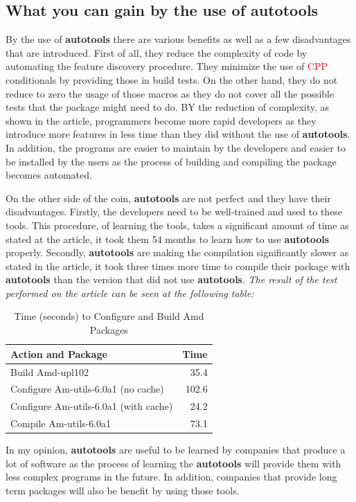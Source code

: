 \documentclass[11pt]{article}
\begin{document}
\subsection{What you can gain by the use of autotools}
By the use of \textbf{autotools} there are various benefits as well as a few disadvantages that are introduced. First of all, they reduce the complexity of code by automating the feature discovery procedure. They minimize the use of \textcolor{red}{CPP} conditionals by providing those in build tests. On the other hand, they do not reduce to zero the usage of those macros as they do not cover all the possible tests that the package might need to do. BY the reduction of complexity, as shown in the article, programmers become more rapid developers as they introduce more features in less time than they did without the use of \textbf{autotools}. In addition, the programs are easier to maintain by the developers and easier to be installed by the users as the process of building and compiling the package becomes automated.

On the other side of the coin, \textbf{autotools} are not perfect and they have their disadvantages. Firstly, the developers need  to be well-trained and used to these tools. This procedure, of learning the tools, takes a significant amount of time as stated at the article, it took them 54 months to learn how to use \textbf{autotools} properly. Secondly, \textbf{autotools} are making the compilation significantly slower as stated in the article, it took three times more time to compile their package with \textbf{autotools} than the version that did not use \textbf{autotools}. \textit{The result of the test performed on the article can be seen at the following table:}

\begin{table}[!htb]
\centering

\begin{tabular}{|l|r|}
\hline
Action and Package & Time\\ \hline
Build Amd-upl102 & 35.4\\ \hline
Configure Am-utils-6.0a1 (no cache) & 102.6\\
Configure Am-utils-6.0a1 (with cache) & 24.2\\
Compile Am-utils-6.0a1 & 73.1\\ \hline
\end{tabular}
\caption{Time (seconds) to Configure and Build Amd Packages \cite{zadok2002}}
\label{table:buildTest}
\end{table}
\FloatBarrier

In my opinion, \textbf{autotools} are useful to be learned by companies that produce a lot of software as the process of learning the \textbf{autotools} will provide them with less complex programs in the future. In addition, companies that provide long term packages will also be benefit by using those tools.

\nocite{*}


\end{document}
